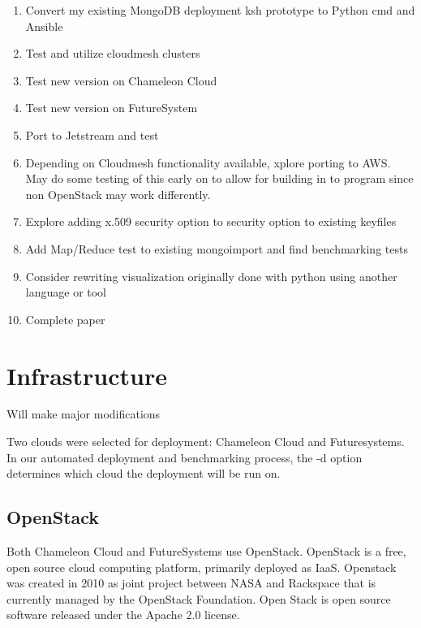 \documentclass[9pt,twocolumn,twoside]{styles/osajnl}
\begin{document}
\vspace{-\topsep}
\begin{enumerate}
\item Convert my existing MongoDB deployment ksh prototype to Python cmd and Ansible
\item Test and utilize cloudmesh clusters
\item Test new version on Chameleon Cloud
\item Test new version on FutureSystem
\item Port to Jetstream and test
\item Depending on Cloudmesh functionality available, xplore porting to AWS.  May do some testing of this early on to allow for building in to program since non OpenStack may work differently.
\item Explore adding x.509 security option to security option to existing keyfiles
\item Add Map/Reduce test to existing mongoimport and find benchmarking tests
\item Consider rewriting visualization originally done with python using another language or tool
\item Complete paper

\end{enumerate}
\vspace{-\topsep}



\section{Infrastructure}

Will make major modifications

Two clouds were selected for deployment: Chameleon Cloud and Futuresystems.  In our automated deployment and benchmarking process, the -d option determines which cloud the deployment will be run on.

\subsection{OpenStack}

Both Chameleon Cloud and FutureSystems use OpenStack.  OpenStack is a free, open source cloud computing platform, primarily deployed as IaaS.  \cite{www-wikiOpenStack}  Openstack was created in 2010 as joint project between NASA and Rackspace that is currently managed by the OpenStack Foundation.  \cite{www-wikiOpenStack} Open Stack is open source software released under the Apache 2.0 license.  \cite{www-openStackFAQ}
\end{document}
